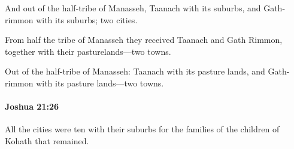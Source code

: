 			\begin{versebox}
					\item[BHS] 
					\item[ASV] And out of the half-tribe of Manasseh, Taanach with its suburbs, and Gath-rimmon with its suburbs; two cities.
					\item[NIV] From half the tribe of Manasseh they received Taanach and Gath Rimmon, together with their pasturelands—two towns.
					\item[NRSV] Out of the half-tribe of Manasseh: Taanach with its pasture lands, and Gath-rimmon with its pasture lands—two towns.
			\end{versebox}

		\paragraph{Joshua 21:26} %
			\label{JOSHUA-21-26}

			All the cities were ten with their suburbs for the families of the children of Kohath that remained.


